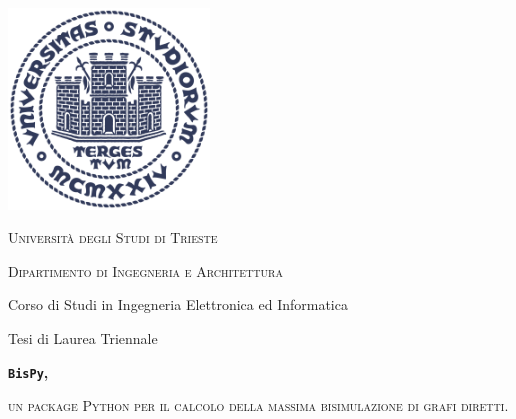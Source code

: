 \documentclass[11pt]{article}
\theoremstyle{definition}
\theoremstyle{plain}
\begin{document}
\begin{titlepage}
  \begin{center}
      \vspace{-3cm}
      \includegraphics[width=0.4\textwidth]{logo}

      \vspace{1.5cm}

      \Large
      \textsc{Università degli Studi di Trieste}
      \makebox[\textwidth][c]{\rule{\textwidth}{.4pt}}

      \textsc{Dipartimento di Ingegneria e Architettura}

      \vspace{0.5cm}
      Corso di Studi in Ingegneria Elettronica ed Informatica

      \vspace{2cm}

      Tesi di Laurea Triennale

      \vspace{2cm}

      \Large
      \textbf{\texttt{BisPy},}

      \large
      \textsc{un package Python per il calcolo della massima bisimulazione di grafi diretti.}
      \vspace{1.5cm}

      \vfill

  \end{center}
\end{titlepage}

\renewcommand\contentsname{Indice}
\tableofcontents
{}


\clearpage

\clearpage

\clearpage

\clearpage

\clearpage

\renewcommand\refname{Bibliografia}


\end{document}

